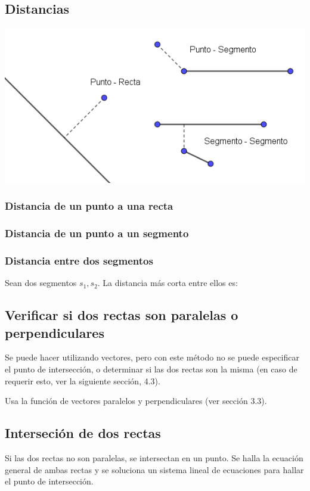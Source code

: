 \documentclass{article}
\begin{document}
\begin{multicols}{2}
\subsection{Distancias}
\includegraphics[width=0.8\columnwidth]{distancias}

\subsubsection{Distancia de un punto a una recta}


\subsubsection{Distancia de un punto a un segmento}


\subsubsection{Distancia entre dos segmentos}
Sean dos segmentos \(s_1, s_2 \). La distancia más corta entre ellos es:
	 

\subsection{Verificar si dos rectas son paralelas o perpendiculares}
Se puede hacer utilizando vectores, pero con este método no se puede especificar el punto de intersección, o determinar si las dos rectas son la misma  (en caso de requerir esto, ver la siguiente sección, 4.3).

Usa la función de vectores paralelos y perpendiculares (ver sección 3.3).


\subsection{Interseción de dos rectas}
Si las dos rectas no son paralelas, se intersectan en un punto. Se halla la ecuación general de ambas rectas y se soluciona un sistema lineal de ecuaciones para hallar el punto de intersección.


\end{multicols}
\end{document}

